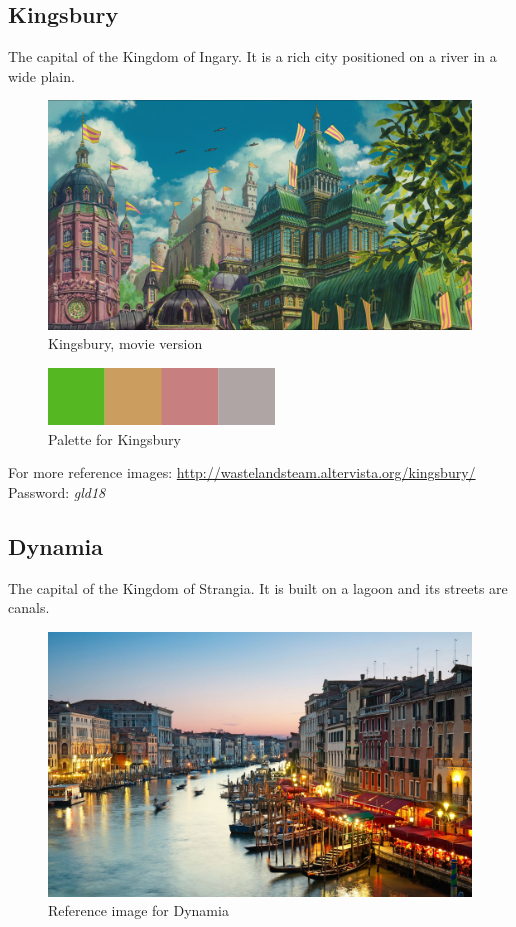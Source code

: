 \subsection{Kingsbury}
The capital of the Kingdom of Ingary. It is a rich city positioned on a river in a wide plain.
\begin{figure}[H]
  \centering
  \includegraphics[width=12cm]{../Images/Locations/kingsbury}
  \caption{Kingsbury, movie version}
\end{figure}

\begin{figure}[H]
  \centering
  \includegraphics[width=6cm]{Images/Palettes/kingsbury}
  \caption{Palette for Kingsbury}
\end{figure}

For more reference images: \url{http://wastelandsteam.altervista.org/kingsbury/} \\
Password: \textit{gld18}

\pagebreak

\subsection{Dynamia}
The capital of the Kingdom of Strangia. It is built on a lagoon and its streets are canals.
\begin{figure}[H]
  \centering
  \includegraphics[width=12cm]{../Images/Locations/dynamia}
  \caption{Reference image for Dynamia}
\end{figure}

